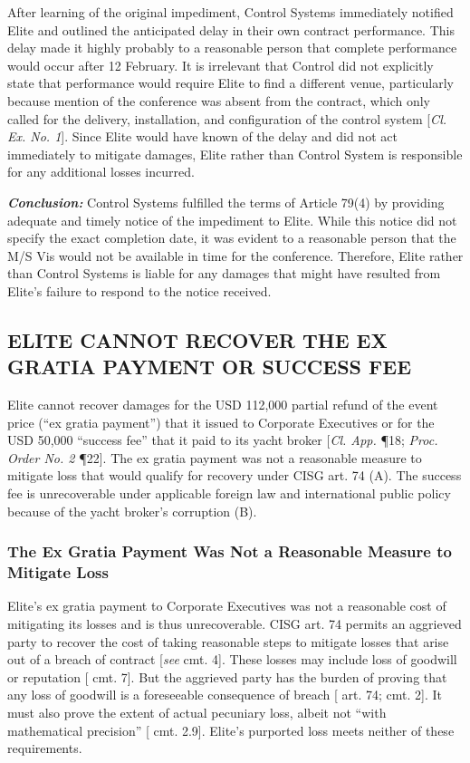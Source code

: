 After learning of the original impediment, Control Systems immediately notified Elite and outlined the anticipated delay in their own contract performance. This delay made it highly probably to a reasonable person that complete performance would occur after 12 February.  It is irrelevant that Control did not explicitly state that performance would require Elite to find a different venue, particularly because mention of the conference was absent from the contract, which only called for the delivery, installation, and configuration of the control system [\textit{Cl. Ex. No. 1}]. Since Elite would have known of the delay and did not act immediately to mitigate damages, Elite rather than Control System is responsible for any additional losses incurred.

\textit{\textbf{Conclusion:}} Control Systems fulfilled the terms of Article 79(4) by providing adequate and timely notice of the impediment to Elite. While this notice did not specify the exact completion date, it was evident to a reasonable person that the M/S Vis would not be available in time for the conference. Therefore, Elite rather than Control Systems is liable for any damages that might have resulted from Elite's failure to respond to the notice received.  

\endparano{}
\subsection{ELITE CANNOT RECOVER THE EX GRATIA PAYMENT OR SUCCESS FEE}
\parano{}

Elite cannot recover damages for the USD 112,000 partial refund of the event price (``ex gratia payment'') that it issued to Corporate Executives or for the USD 50,000 ``success fee'' that it paid to its yacht broker [\textit{Cl. App.} \P 18; \textit{Proc. Order No. 2} \P 22]. The ex gratia payment was not a reasonable measure to mitigate loss that would qualify for recovery under CISG art. 74 (A). The success fee is unrecoverable under applicable foreign law and international public policy because of the yacht broker's corruption (B).

\subsubsection{The Ex Gratia Payment Was Not a Reasonable Measure to Mitigate Loss}

Elite's ex gratia payment to Corporate Executives was not a reasonable cost of mitigating its losses and is thus unrecoverable. CISG art. 74 permits an aggrieved party to recover the cost of taking reasonable steps to mitigate losses that arise out of a breach of contract [\textit{see} \cite{CISG-AC Op. No. 6} cmt. 4]. These losses may include loss of goodwill or reputation [\cite{CISG-AC Op. No. 6} cmt. 7]. But the aggrieved party has the burden of proving that any loss of goodwill is a foreseeable consequence of breach [\cite{CISG} art. 74; \cite{CISG-AC Op. No. 6} cmt. 2]. It must also prove the extent of actual pecuniary loss, albeit not ``with mathematical precision'' [\cite{CISG-AC Op. No. 6} cmt. 2.9]. Elite's purported loss meets neither of these requirements.

